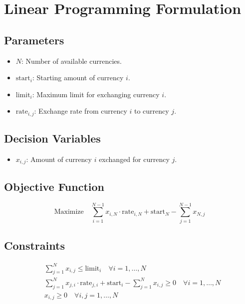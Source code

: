 \documentclass{article}
\begin{document}
\section*{Linear Programming Formulation}

\subsection*{Parameters}
\begin{itemize}
    \item \( N \): Number of available currencies.
    \item \(\text{start}_i\): Starting amount of currency \( i \).
    \item \(\text{limit}_i\): Maximum limit for exchanging currency \( i \).
    \item \(\text{rate}_{i,j}\): Exchange rate from currency \( i \) to currency \( j \).
\end{itemize}

\subsection*{Decision Variables}
\begin{itemize}
    \item \( x_{i,j} \): Amount of currency \( i \) exchanged for currency \( j \).
\end{itemize}

\subsection*{Objective Function}
\[
\text{Maximize} \quad \sum_{i=1}^{N-1} x_{i,N} \cdot \text{rate}_{i,N} + \text{start}_N - \sum_{j=1}^{N-1} x_{N,j}
\]

\subsection*{Constraints}
\begin{align}
    &\sum_{j=1}^{N} x_{i,j} \leq \text{limit}_i \quad \forall i = 1, \ldots, N \\
    &\sum_{j=1}^{N} x_{j,i} \cdot \text{rate}_{j,i} + \text{start}_i - \sum_{j=1}^{N} x_{i,j} \geq 0  \quad \forall i = 1, \ldots, N \\
    &x_{i,j} \geq 0 \quad \forall i, j = 1, \ldots, N
\end{align}
\end{document}
